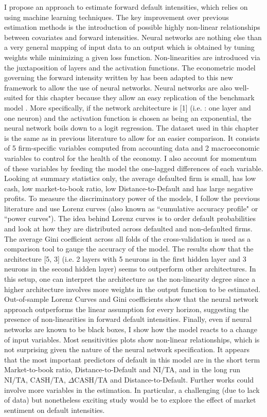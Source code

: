 I propose an approach to estimate forward default intensities, which relies on using machine learning techniques. The key improvement over previous estimation methods is the introduction of possible highly non-linear relationships between covariates and forward intensities. Neural networks are nothing else than a very general mapping of input data to an output which is obtained by tuning weights while minimizing a given loss function. Non-linearities are introduced via the juxtaposition of layers and the activation functions. The econometric model governing the forward intensity written by \citet{Duan2012} has been adapted to this new framework to allow the use of neural networks. Neural networks are also well-suited for this chapter because they allow an easy replication of the benchmark model \citet{Duan2012}. More specifically, if the network architecture is [1] (i.e. : one layer and one neuron) and the activation function is chosen as being an exponential, the neural network boils down to a logit regression. The dataset used in this chapter is the same as in previous literature to allow for an easier comparison. It consists of 5 firm-specific variables computed from accounting data and 2 macroeconomic variables to control for the health of the economy. I also account for momentum of these variables by feeding the model the one-lagged differences of each variable. Looking at summary statistics only, the average defaulted firm is small, has low cash, low market-to-book ratio, low Distance-to-Default and has large negative profits. To measure the discriminatory power of the models, I follow the previous literature and use Lorenz curves (also known as ``cumulative accuracy profile" or ``power curves"). The idea behind Lorenz curves is to order default probabilities and look at how they are distributed across defaulted and non-defaulted firms. The average Gini coefficient across all folds of the cross-validation is used as a comparison tool to gauge the accuracy of the model. The results show that the architecture [5, 3] (i.e. 2 layers with 5 neurons in the first hidden layer and 3 neurons in the second hidden layer) seems to outperform other architectures. In this setup, one can interpret the architecture as the non-linearity degree since a higher architecture involves more weights in the output function to be estimated. Out-of-sample Lorenz Curves and Gini coefficients show that the neural network approach outperforms the linear assumption for every horizon, suggesting the presence of non-linearities in forward default intensities. Finally, even if neural networks are known to be black boxes, I show how the model reacts to a change of input variables. Most sensitivities plots show non-linear relationships, which is not surprising given the nature of the neural network specification. It appears that the most important predictors of default in this model are in the short term Market-to-book ratio, Distance-to-Default and NI/TA, and in the long run NI/TA, CASH/TA, $\Delta$CASH/TA and Distance-to-Default. Further works could involve more variables in the estimation. In particular, a challenging (due to lack of data) but nonetheless exciting study would be to explore the effect of market sentiment on default intensities.



